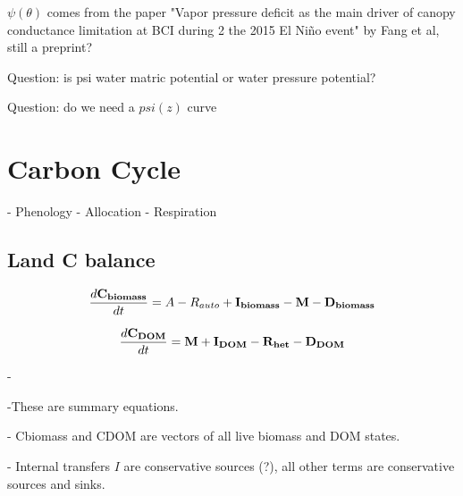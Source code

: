 \documentclass[twoside,10pt]{report}
\begin{document}
$\psi (\theta)$ comes from the paper "Vapor pressure deficit as the main driver of canopy conductance limitation at BCI during 2 the 2015 El Niño event" by Fang et al, still a preprint?

Question: is psi water matric potential or water pressure potential?

Question: do we need a $psi(z)$ curve

\begin{table}[]
\caption{Parameters for Non-steady state plant hydraulics model}
\label{tab:plant_hydraulics_non_steady_parameters}
\end{table}


\chapter{Carbon Cycle}
- Phenology
- Allocation
- Respiration

\section{Land C balance}
\begin{equation}
\frac{d\bf{C_{biomass}}}{dt} = A - R_{auto} + \bf{I_{biomass}} - \bf{M} - \bf{D_{biomass}}
\end{equation}

\begin{equation}
\frac{d\bf{C_{DOM}}}{dt} = \bf{M} + \bf{I_{DOM}} -  \bf{R_{het}} - \bf{D_{DOM}}
\end{equation}

-

-These are summary equations.

- Cbiomass and CDOM are vectors of all live biomass and DOM states. 

- Internal transfers $I$ are conservative sources (?), all other terms are  conservative sources and sinks.
\end{document}
